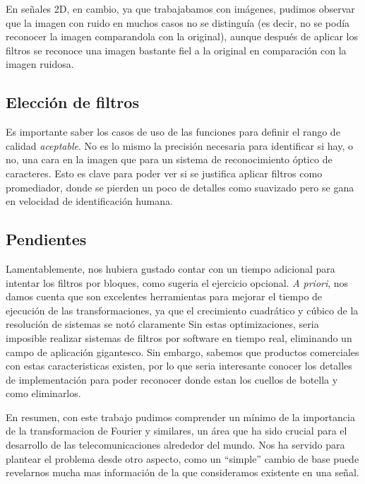 En se\~nales 2D, en cambio, ya que trabajabamos con im\'agenes, pudimos observar que la imagen con ruido en muchos
casos no se distingu\'ia (es decir, no se pod\'ia reconocer la imagen comparandola con la original), aunque despu\'es
de aplicar los filtros se reconoce una imagen bastante fiel a la original en comparaci\'on con la imagen ruidosa.

\subsection{Elecci\'on de filtros}

Es importante saber los casos de uso de las funciones para definir el rango de calidad \textit{aceptable}. No es lo mismo
la precisi\'on necesaria para identificar si hay, o no, una cara en la imagen que para un sistema de reconocimiento \'optico
de caracteres. Esto es clave para poder ver si se justifica aplicar filtros como promediador, donde se pierden un poco de detalles como suavizado
pero se gana en velocidad de identificaci\'on humana.

\subsection{Pendientes}

Lamentablemente, nos hubiera gustado contar con un tiempo adicional para intentar los filtros por bloques, como sugeria el ejercicio
opcional. \textit{A priori}, nos damos cuenta que son excelentes herramientas para mejorar el tiempo de ejecuci\'on
de las transformaciones, ya que el crecimiento cuadr\'atico y c\'ubico de la resoluci\'on de sistemas se not\'o claramente
Sin estas optimizaciones, seria imposible realizar sistemas de filtros por software en tiempo real, eliminando un campo de 
aplicaci\'on gigantesco. Sin embargo, sabemos que productos comerciales con estas caracteristicas existen, por lo que
seria interesante conocer los detalles de implementaci\'on para poder reconocer donde estan los cuellos de botella y como
eliminarlos.

En resumen, con este trabajo pudimos comprender un m\'inimo de la importancia de la transformacion de Fourier y similares,
un \'area que ha sido crucial para el desarrollo de las telecomunicaciones alrededor del mundo. Nos ha servido para plantear
el problema desde otro aspecto, como un ``simple'' cambio de base puede revelarnos mucha mas informaci\'on de la que 
consideramos existente en una se\~nal. 

